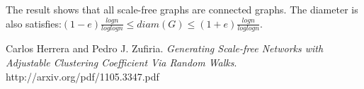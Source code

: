 \documentclass[a4paper,11pt]{article}
\begin{document}
The result shows that all scale-free graphs are connected graphs. The diameter is also satisfies:$(1-e)\frac{logn}{loglogn} \le diam(G) \le (1+e)\frac{logn}{loglogn}$.


\begin{thebibliography}{9}
  Carlos Herrera and Pedro J. Zufiria.
  \textit{Generating Scale-free Networks with Adjustable
Clustering Coefficient Via Random Walks}.
  http://arxiv.org/pdf/1105.3347.pdf
\end{thebibliography}  
\end{document}
